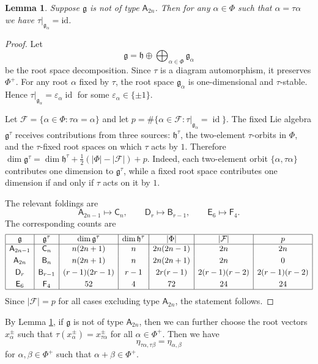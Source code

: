 \documentclass[11pt,reqno]{amsart}
\numberwithin{equation}{section}
\newtheorem{lem}[thm]{Lemma}
\theoremstyle{definition}
\theoremstyle{remark}
\newcommand{\beq}{\begin{equation}}
\newcommand{\eeq}{\end{equation}}
\newcommand{\g}{\mathfrak{g}}
\begin{document}
\begin{lem}\label{lem:fixed}
Suppose $\g$ is not of type $\mathsf A_{2n}$. Then for any $\alpha\in \Phi$ such that $\alpha=\tau \alpha$ we have $\tau|_{\g_\alpha}=\mathrm{id}$.
\end{lem}
\begin{proof}
Let
\[
\mathfrak g=\mathfrak h\oplus \bigoplus_{\alpha\in\Phi}\mathfrak g_\alpha
\]
be the root space decomposition. Since $\tau$ is a diagram automorphism, it
preserves $\Phi^+$. For any root $\alpha$ fixed by $\tau$, the root space
$\mathfrak g_\alpha$ is one-dimensional and $\tau$-stable. Hence $\tau|_{\mathfrak g_\alpha}=\varepsilon_\alpha \operatorname{id}$ for some $\varepsilon_\alpha\in\{\pm 1\}$. 

Let $\mathcal F=\{\alpha\in\Phi:\tau\alpha=\alpha\}$ and let $p=\#\{\alpha\in \mathcal F:\tau|_{\mathfrak g_\alpha}=\operatorname{id}\}$.
The fixed Lie algebra $\mathfrak g^\tau$ receives contributions from three
sources: $\mathfrak h^\tau$, the two-element $\tau$-orbits in $\Phi$, and the $\tau$-fixed root spaces
on which $\tau$ acts by $1$. Therefore $\dim \mathfrak g^\tau
=
\dim \mathfrak h^\tau
+
\tfrac{1}{2}(|\Phi|-|\mathcal F|)
+
p$.
Indeed, each two-element orbit $\{\alpha,\tau\alpha\}$ contributes one
dimension to $\mathfrak g^\tau$, while a fixed root space contributes one
dimension if and only if $\tau$ acts on it by $1$.

The relevant foldings are
\[
\mathsf A_{2n-1}\mapsto \mathsf  C_n,\qquad
\mathsf D_r\mapsto \mathsf B_{r-1},\qquad
\mathsf E_6\mapsto \mathsf F_4.
\]
The corresponding counts are
\[
\begin{array}{|c|c|c|c|c|c|c|}
\hline
\mathfrak g
&
\mathfrak g^\tau
&
\dim \mathfrak g^\tau
&
\dim\mathfrak h^\tau
&
|\Phi|
&
|\mathcal F|
&
p
\\ \hline
\mathsf A_{2n-1}
&
\mathsf C_n
&
n(2n+1)
&
n
&
2n(2n-1)
&
2n
&
2n
\\[1mm]
\mathsf A_{2n}
&
\mathsf B_n
&
n(2n+1)
&
n
&
2n(2n+1)
&
2n
&
0
\\[1mm]
\mathsf D_r
&
\mathsf B_{r-1}
&
(r-1)(2r-1)
&
r-1
&
2r(r-1)
&
2(r-1)(r-2)
&
2(r-1)(r-2)
\\[1mm]
\mathsf E_6
&
\mathsf F_4
&
52
&
4
&
72
&
24
&
24
\\ \hline
\end{array}
\]
Since $|\mathcal F|=p$ for all cases excluding type $\mathsf A_{2n}$, the statement follows.
\end{proof}

By Lemma \ref{lem:fixed}, if $\g$ is not of type $\mathsf A_{2n}$, then we can further choose the root vectors $x_\alpha^\pm$ such that $\tau(x_\alpha^\pm)=x_{\tau \alpha}^\pm$ for all $\alpha\in \Phi^+$. Then we have
\beq\label{eta-tau}
\eta_{\tau\alpha,\tau\beta}=\eta_{\alpha,\beta}
\eeq
for $\alpha,\beta\in\Phi^+$ such that $\alpha+\beta\in\Phi^+$.
\end{document}
